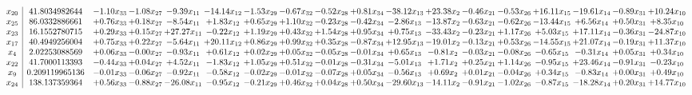 \documentclass[9pt]{article}
\begin{document}
 \[\begin{array}{c| c c@{\hskip 2pt} c@{\hskip 2pt} c@{\hskip 2pt} c@{\hskip 2pt} c@{\hskip 2pt} c@{\hskip 2pt} c@{\hskip 2pt} c@{\hskip 2pt} c@{\hskip 2pt} c@{\hskip 2pt} c@{\hskip 2pt} c@{\hskip 2pt} c@{\hskip 2pt} c@{\hskip 2pt} c@{\hskip 2pt} c@{\hskip 2pt} }
 x_{20}   &  41.8034982644 & -1.10 x_{33} & -1.08 x_{27} & -9.39 x_{11} & -14.14 x_{12} & -1.53 x_{29} & -0.67 x_{32} & -0.52 x_{28} & +  0.81 x_{34} & -38.12 x_{13} & + 23.38 x_{2} & -0.46 x_{21} & -0.53 x_{26} & + 16.11 x_{15} & -19.61 x_{14} & -0.89 x_{31} & + 10.24 x_{10}\\
 x_{25}   &  86.0332886661 & +  0.76 x_{33} & +  0.18 x_{27} & -8.54 x_{11} & +  1.83 x_{12} & +  0.65 x_{29} & +  1.10 x_{32} & -0.23 x_{28} & -0.42 x_{34} & -2.86 x_{13} & -13.87 x_{2} & -0.63 x_{21} & -0.62 x_{26} & -13.44 x_{15} & +  6.56 x_{14} & +  0.50 x_{31} & +  8.35 x_{10}\\
 x_{23}   &  16.1552780715 & +  0.29 x_{33} & +  0.15 x_{27} & + 27.27 x_{11} & -0.22 x_{12} & +  1.19 x_{29} & +  0.43 x_{32} & +  1.54 x_{28} & +  0.95 x_{34} & +  0.75 x_{13} & -33.43 x_{2} & -0.23 x_{21} & +  1.17 x_{26} & +  5.03 x_{15} & + 17.11 x_{14} & -0.36 x_{31} & -24.87 x_{10}\\
 x_{17}   &  40.4949256004 & +  0.75 x_{33} & +  0.22 x_{27} & -5.64 x_{11} & + 20.11 x_{12} & +  0.86 x_{29} & +  0.99 x_{32} & +  0.35 x_{28} & -0.87 x_{34} & + 12.95 x_{13} & -19.01 x_{2} & -0.13 x_{21} & +  0.53 x_{26} & -14.55 x_{15} & + 21.07 x_{14} & -0.19 x_{31} & + 11.37 x_{10}\\
 x_{4}   &  2.02253088569 & +  0.06 x_{33} & -0.00 x_{27} & -0.93 x_{11} & +  0.61 x_{12} & +  0.02 x_{29} & +  0.05 x_{32} & -0.05 x_{28} & -0.01 x_{34} & +  0.65 x_{13} & -0.81 x_{2} & -0.03 x_{21} & -0.08 x_{26} & -0.65 x_{15} & -0.31 x_{14} & +  0.05 x_{31} & +  0.34 x_{10}\\
 x_{22}   &  41.7000113393 & -0.44 x_{33} & +  0.04 x_{27} & +  4.52 x_{11} & -1.83 x_{12} & +  1.05 x_{29} & +  0.51 x_{32} & -0.01 x_{28} & -0.31 x_{34} & -5.01 x_{13} & +  1.71 x_{2} & +  0.25 x_{21} & +  1.14 x_{26} & -0.95 x_{15} & + 23.46 x_{14} & -0.91 x_{31} & -0.23 x_{10}\\
 x_{9}   &  0.209119965136 & -0.01 x_{33} & -0.06 x_{27} & -0.92 x_{11} & -0.58 x_{12} & -0.02 x_{29} & -0.01 x_{32} & -0.07 x_{28} & +  0.05 x_{34} & -0.56 x_{13} & +  0.69 x_{2} & +  0.01 x_{21} & -0.04 x_{26} & +  0.34 x_{15} & -0.83 x_{14} & +  0.00 x_{31} & +  0.49 x_{10}\\
 x_{24}   &  138.137359364 & +  0.56 x_{33} & -0.88 x_{27} & -26.08 x_{11} & -0.95 x_{12} & -0.21 x_{29} & +  0.46 x_{32} & +  0.04 x_{28} & +  0.50 x_{34} & -29.60 x_{13} & -14.11 x_{2} & -0.91 x_{21} & -1.02 x_{26} & -0.87 x_{15} & -18.28 x_{14} & +  0.20 x_{31} & + 14.77 x_{10}\\

\end{array}\]
\end{document}
